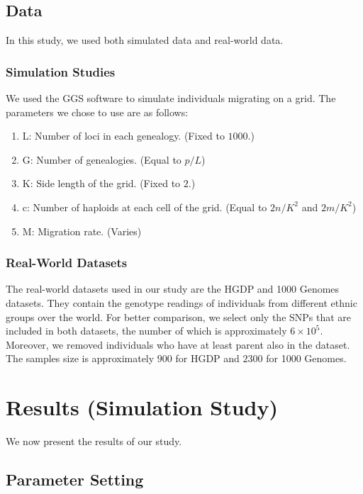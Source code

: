 \documentclass{article}[12pt]
\begin{document}
\subsection{Data}

In this study, we used both simulated data and real-world data.

\subsubsection{Simulation Studies}

We used the GGS software to simulate individuals migrating on a grid.
The parameters we chose to use are as follows:
\begin{enumerate}
\item L: Number of loci in each genealogy. (Fixed to $1000$.)
\item G: Number of genealogies. (Equal to $p / L$)
\item K: Side length of the grid. (Fixed to $2$.)
\item c: Number of haploids at each cell of the grid. (Equal to $2n / K^2$ and
$2m / K^2$)
\item M: Migration rate. (Varies)
\end{enumerate}

\subsubsection{Real-World Datasets}

The real-world datasets used in our study are the HGDP and 1000 Genomes datasets.
They contain the genotype readings of individuals from different ethnic groups over the world.
For better comparison, we select only the SNPs that are included in both datasets,
the number of which is approximately $6 \times 10^5$.
Moreover, we removed individuals who have at least parent also in the dataset.
The samples size is approximately $900$ for HGDP and $2300$ for 1000 Genomes.



\section{Results (Simulation Study)}

We now present the results of our study.

\subsection{Parameter Setting}
\end{document}
